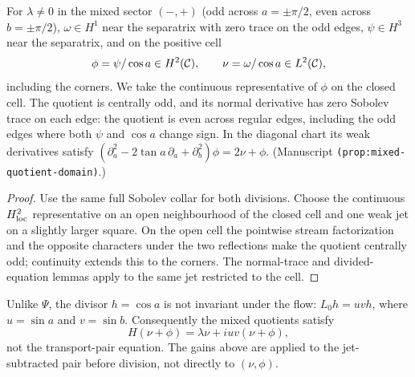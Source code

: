 \begin{proposition}
\label{prop:mixed-quotient-domain}
\leanok
For $\lambda\ne0$ in the mixed sector $(-,+)$ (odd across $a=\pm\pi/2$, even across
$b=\pm\pi/2$), $\omega\in H^1$ near the separatrix with zero trace on the odd
edges, $\psi\in H^3$ near the separatrix, and on the positive cell
\[
  \phi=\psi/\cos a\in H^2(\mathcal{C}),\qquad \nu=\omega/\cos a\in L^2(\mathcal{C}),
\]
including the corners. We take the continuous representative of $\phi$
on the closed cell. The quotient is centrally odd, and its normal derivative
has zero Sobolev trace on each edge: the quotient is even across regular edges,
including the odd edges where both $\psi$ and $\cos a$ change sign. In the
diagonal chart its weak derivatives satisfy
$(\partial_a^2-2\tan a\,\partial_a+\partial_b^2)\phi=2\nu+\phi$.
(Manuscript \texttt{(prop:mixed-quotient-domain)}.)
\end{proposition}

\begin{proof}
\leanok
Use the same full Sobolev collar for both divisions. Choose the continuous
$H^2_{\rm loc}$ representative on an open neighbourhood of the closed cell
and one weak jet on a slightly larger square. On the open cell the
pointwise stream factorization and the opposite characters under the two
reflections make the quotient centrally odd; continuity extends this to
the corners. The normal-trace and divided-equation lemmas apply to the
same jet restricted to the cell.
\end{proof}

\begin{remark}
Unlike $\Psi$, the divisor $h=\cos a$ is not invariant under the flow:
$L_0h=uvh$, where $u=\sin a$ and $v=\sin b$.
Consequently the mixed quotients satisfy
\[
 H(\nu+\phi)=\lambda\nu+iuv(\nu+\phi),
\]
not the transport-pair equation. The gains above are applied to the
jet-subtracted pair before division, not directly to $(\nu,\phi)$.
\end{remark}

